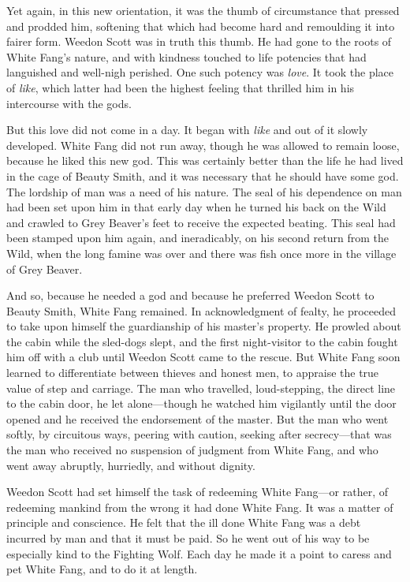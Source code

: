 \documentclass[10pt]{book}
\begin{document}
Yet again, in this new orientation, it was the thumb of circumstance
that pressed and prodded him, softening that which had become hard and
remoulding it into fairer form. Weedon Scott was in truth this thumb.
He had gone to the roots of White Fang’s nature, and with kindness
touched to life potencies that had languished and well-nigh perished.
One such potency was \emph{love}. It took the place of \emph{like}, which latter
had been the highest feeling that thrilled him in his intercourse with
the gods.

But this love did not come in a day. It began with \emph{like} and out of it
slowly developed. White Fang did not run away, though he was allowed to
remain loose, because he liked this new god. This was certainly better
than the life he had lived in the cage of Beauty Smith, and it was
necessary that he should have some god. The lordship of man was a need
of his nature. The seal of his dependence on man had been set upon him
in that early day when he turned his back on the Wild and crawled to
Grey Beaver’s feet to receive the expected beating. This seal had been
stamped upon him again, and ineradicably, on his second return from the
Wild, when the long famine was over and there was fish once more in the
village of Grey Beaver.

And so, because he needed a god and because he preferred Weedon Scott
to Beauty Smith, White Fang remained. In acknowledgment of fealty, he
proceeded to take upon himself the guardianship of his master’s
property. He prowled about the cabin while the sled-dogs slept, and the
first night-visitor to the cabin fought him off with a club until
Weedon Scott came to the rescue. But White Fang soon learned to
differentiate between thieves and honest men, to appraise the true
value of step and carriage. The man who travelled, loud-stepping, the
direct line to the cabin door, he let alone—though he watched him
vigilantly until the door opened and he received the endorsement of the
master. But the man who went softly, by circuitous ways, peering with
caution, seeking after secrecy—that was the man who received no
suspension of judgment from White Fang, and who went away abruptly,
hurriedly, and without dignity.

Weedon Scott had set himself the task of redeeming White Fang—or
rather, of redeeming mankind from the wrong it had done White Fang. It
was a matter of principle and conscience. He felt that the ill done
White Fang was a debt incurred by man and that it must be paid. So he
went out of his way to be especially kind to the Fighting Wolf. Each
day he made it a point to caress and pet White Fang, and to do it at
length.
\end{document}
